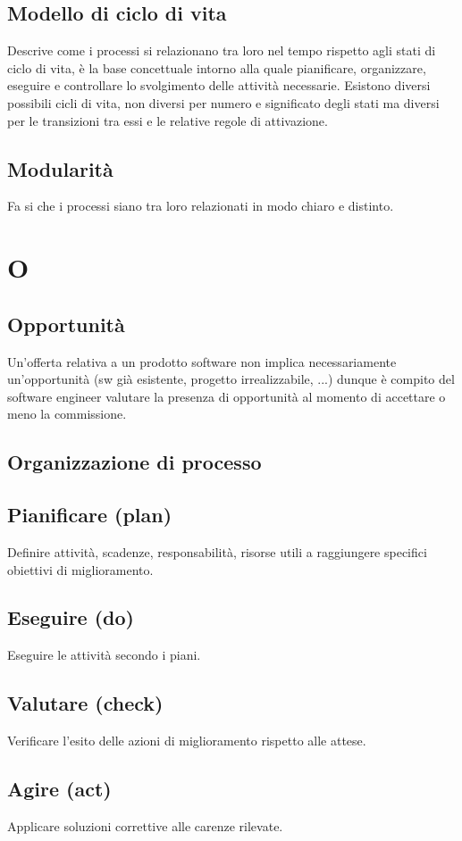 \documentclass[a4paper]{report}
\newcommand{\mychapter}[2]{
	\setcounter{chapter}{#1}
	\setcounter{section}{0}
	\setcounter{subsection}{1}
	\chapter*{#2}
	\addcontentsline{toc}{chapter}{#2}
}
\begin{document}
\section{Modello di ciclo di vita} Descrive come i processi si relazionano tra loro nel tempo rispetto agli stati di ciclo di vita, è la base concettuale intorno alla quale pianificare, organizzare, eseguire e controllare lo svolgimento delle attività necessarie. Esistono diversi possibili cicli di vita, non diversi per numero e significato degli stati ma diversi per le transizioni tra essi e le relative regole di attivazione.
\section{Modularità} Fa si che i processi siano tra loro relazionati in modo chiaro e distinto.

\mychapter{10}{O}

\section{Opportunità} Un’offerta relativa a un prodotto software non implica necessariamente un’opportunità (sw già esistente, progetto irrealizzabile, ...) dunque è compito del software engineer valutare la presenza di opportunità al momento di accettare o meno la commissione.
\section{Organizzazione di processo} 
  \section{Pianificare (plan)} Definire attività, scadenze, responsabilità, risorse utili a raggiungere specifici obiettivi di miglioramento.
  \section{Eseguire (do)} Eseguire le attività secondo i piani.
  \section{Valutare (check)} Verificare l’esito delle azioni di miglioramento rispetto alle attese.
  \section{Agire (act)} Applicare soluzioni correttive alle carenze rilevate.
\end{document}
